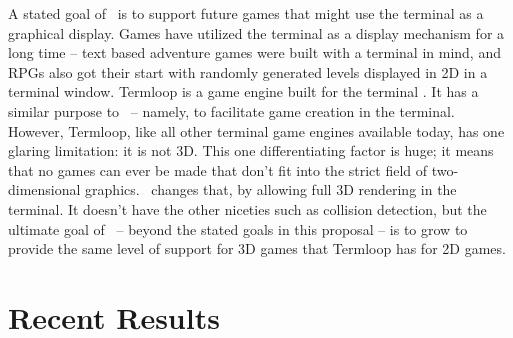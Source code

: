 A stated goal of \name\ is to support future games that might use the terminal as a graphical display.
Games have utilized the terminal as a display mechanism for a long time -- text based adventure games were built with a terminal in mind, and RPGs also got their start with randomly generated levels displayed in 2D in a terminal window.
Termloop is a game engine built for the terminal \cite{termloop}.
It has a similar purpose to \name\ -- namely, to facilitate game creation in the terminal.
However, Termloop, like all other terminal game engines available today, has one glaring limitation: it is not 3D.
This one differentiating factor is huge; it means that no games can ever be made that don't fit into the strict field of two-dimensional graphics.
\name\ changes that, by allowing full 3D rendering in the terminal.
It doesn't have the other niceties such as collision detection, but the ultimate goal of \name\ -- beyond the stated goals in this proposal -- is to grow to provide the same level of support for 3D games that Termloop has for 2D games.


\section{Recent Results}
